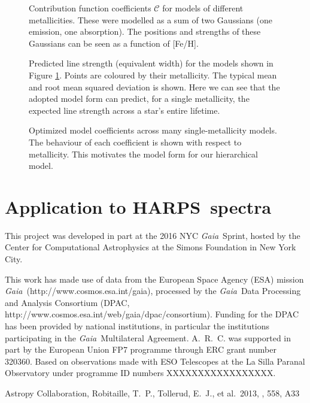 \documentclass{aastex61}
\newcommand{\acronym}[1]{{\small{#1}}}
\newcommand{\project}[1]{\textsl{#1}}
\newcommand{\gaia}{\project{Gaia}}
\newcommand{\harps}{\acronym{HARPS}}
\begin{document}
			

\begin{figure}
	\caption{
		Contribution function coefficients $\mathcal{C}$ for models
		of different metallicities. These were modelled as a sum of two
		Gaussians (one emission, one absorption). The positions and
		strengths of these Gaussians can be seen as a function of [Fe/H].
		\label{fig:multi_photospheric_coefficients}}
\end{figure}


\begin{figure}
	\caption{
		Predicted line strength (equivalent width) for the models
		shown in Figure \ref{fig:multi_photospheric_coefficients}.
		Points are coloured by their metallicity.
		The typical mean and root mean squared deviation is shown.
		Here we can see that the adopted model form can predict,
		for a single metallicity, the expected line strength
		across a star's entire lifetime.
		\label{fig:multi_predicted_ew}}
\end{figure}


\begin{figure}
	\caption{
		Optimized model coefficients across many single-metallicity
		models.
		The behaviour of each coefficient is shown with respect to
		metallicity. This motivates the model form for our
		hierarchical model.
		\label{fig:multi_model_coefficients}}
\end{figure}


\section{Application to \harps\ spectra}
\label{sec:harps}





\acknowledgments

This project was developed in part at the 2016 NYC \gaia\ Sprint, hosted by the Center for Computational Astrophysics at the Simons Foundation in New York City.

This work has made use of data from the European Space Agency (ESA) mission \gaia\ 
(http://www.cosmos.esa.int/gaia), processed by the \gaia\ Data Processing and Analysis 
Consortium (DPAC, http://www.cosmos.esa.int/web/gaia/dpac/consortium). Funding for the
DPAC has been provided by national institutions, in particular the institutions 
participating in the \gaia\ Multilateral Agreement.
A.~R.~C. was supported in part by the European Union FP7 programme through ERC grant number 320360.
Based on observations made with ESO Telescopes at the La Silla Paranal Observatory under programme ID numbers XXXXXXXXXXXXXXXXX.





\begin{thebibliography}{}

 Astropy Collaboration, Robitaille, T.~P., Tollerud, E.~J., et al.\ 2013, \aap, 558, A33 

\end{thebibliography}
\end{document}
